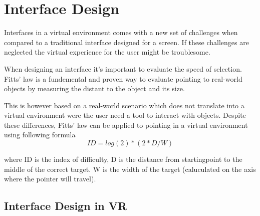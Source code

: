 \section{Interface Design}
Interfaces in a virtual environment comes with a new set of challenges when compared to a traditional interface designed for a screen. If these challenges are neglected the virtual experience for the user might be troublesome.

When designing an interface it's important to evaluate the speed of selection. Fitts' law is a fundemental and proven way to evaluate pointing to real-world objects by measuring the distant to the object and its size.\cite{interface:Fitts1954}

This is however based on a real-world scenario which does not translate into a virtual environment were the user need a tool to interact with objects. Despite these differences, Fitts' law can be applied to pointing in a virtual environment using following formula  \cite{interface:card1978evaluation}
\begin{equation}
ID = log(2) * ( 2* D / W )
\end{equation}

where ID is the index of difficulty, D is the distance from startingpoint to the middle of the correct target. W is the width of the target (caluculated  on the axis where the pointer will travel).

\subsection {Interface Design in VR}
